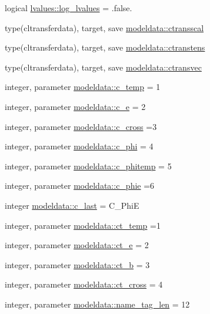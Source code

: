 \begin{DoxyCompactItemize}
\item 
logical \mbox{\hyperlink{namespacelvalues_afe164d781a115f4ab472604a3b522c6d}{lvalues\+::log\+\_\+lvalues}} = .false.
\item 
type(cltransferdata), target, save \mbox{\hyperlink{namespacemodeldata_a34bd8af8076e850aa1bd0bd9979be120}{modeldata\+::ctransscal}}
\item 
type(cltransferdata), target, save \mbox{\hyperlink{namespacemodeldata_a432da70b3966012f72663b1b37c5f44d}{modeldata\+::ctranstens}}
\item 
type(cltransferdata), target, save \mbox{\hyperlink{namespacemodeldata_ad30179531817ef1d8f3c57eeb179702d}{modeldata\+::ctransvec}}
\item 
integer, parameter \mbox{\hyperlink{namespacemodeldata_ab144c0dde977b1695db87bc0a2eb3906}{modeldata\+::c\+\_\+temp}} = 1
\item 
integer, parameter \mbox{\hyperlink{namespacemodeldata_a1697c6436c81028fc5378aa20c691bc6}{modeldata\+::c\+\_\+e}} = 2
\item 
integer, parameter \mbox{\hyperlink{namespacemodeldata_a3b2071eab09222beb5e8e06ccd8764f3}{modeldata\+::c\+\_\+cross}} =3
\item 
integer, parameter \mbox{\hyperlink{namespacemodeldata_ae74d57bf66536040e60bd4e100a29a78}{modeldata\+::c\+\_\+phi}} = 4
\item 
integer, parameter \mbox{\hyperlink{namespacemodeldata_a55f3705dd9a17416caa44b692f8bd38c}{modeldata\+::c\+\_\+phitemp}} = 5
\item 
integer, parameter \mbox{\hyperlink{namespacemodeldata_a0b2ffa13b78be0e1097e0696f61b3d67}{modeldata\+::c\+\_\+phie}} =6
\item 
integer \mbox{\hyperlink{namespacemodeldata_a775752af289f0f86e09da60b795fd542}{modeldata\+::c\+\_\+last}} = C\+\_\+\+PhiE
\item 
integer, parameter \mbox{\hyperlink{namespacemodeldata_a0852164e9866929946aab4fdf78ca2b2}{modeldata\+::ct\+\_\+temp}} =1
\item 
integer, parameter \mbox{\hyperlink{namespacemodeldata_a5fa8e9929dddc8461255d21037ce5817}{modeldata\+::ct\+\_\+e}} = 2
\item 
integer, parameter \mbox{\hyperlink{namespacemodeldata_ae2b16c12d10fc3ad1bf9b8bcda35fa19}{modeldata\+::ct\+\_\+b}} = 3
\item 
integer, parameter \mbox{\hyperlink{namespacemodeldata_a76668d6bad37db06c7b9a47cdeba14dc}{modeldata\+::ct\+\_\+cross}} = 4
\item 
integer, parameter \mbox{\hyperlink{namespacemodeldata_a2ead755d89390eb003edcde34ebf2c99}{modeldata\+::name\+\_\+tag\+\_\+len}} = 12

\end{DoxyCompactItemize}
